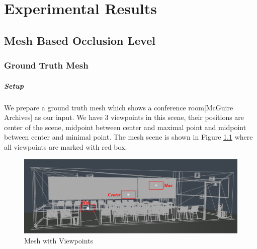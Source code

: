 \documentclass[11pt, a4paper,oneside,chapterprefix=false]{scrbook}
\begin{document}
\chapter{Experimental Results} \label{chp:experiments}


\section{Mesh Based Occlusion Level}

\subsection{Ground Truth Mesh}

\paragraph{Setup}

We prepare a ground truth mesh which shows a conference room[McGuire Archives] as our input. We have 3 viewpoints in this scene, their positions are center of the scene, midpoint between center and maximal point and midpoint between center and minimal point. The mesh scene is shown in Figure \ref{fig:mesh with viewpoints} where all viewpoints are marked with red box. 

\noindent
\begin{minipage}{\textwidth}
    \begin{figure}[H]
        \centering
        \includegraphics*[width=1.0\textwidth]{figures/mesh with vps.png}
        \caption{Mesh with Viewpoints}
        \label{fig:mesh with viewpoints}
    \end{figure}
\end{minipage}
\hfill
\end{document}
